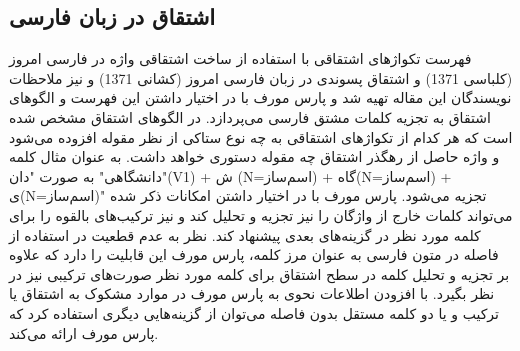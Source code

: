 \documentclass[12pt,onecolumn,a4paper]{article}
\begin{document}
    \subsection{اشتقاق در زبان فارسی}
    فهرست تکواژهای اشتقاقی با استفاده از ساخت اشتقاقی واژه در فارسی امروز (کلباسی 1371) و اشتقاق پسوندی در زبان فارسی امروز (کشانی 1371) و نیز ملاحظات نویسندگان این مقاله تهیه شد و پارس مورف با در اختیار داشتن این فهرست و الگوهای اشتقاق به تجزیه کلمات مشتق فارسی می‌پردازد. در الگوهای اشتقاق مشخص شده است که هر کدام از تکواژهای اشتقاقی به چه نوع ستاکی از نظر مقوله افزوده می‌شود و واژه حاصل از رهگذر اشتقاق چه مقوله دستوری خواهد داشت. به عنوان مثال کلمه "دانشگاهی" به صورت "دان(V1) + ش (N=اسم‌ساز) + گاه(N=اسم‌ساز) + ی(N=اسم‌ساز)" تجزیه می‌شود. پارس مورف با در اختیار داشتن امکانات ذکر شده می‌تواند کلمات خارج از واژگان را نیز تجزیه و تحلیل کند و نیز ترکیب‌های بالقوه را برای کلمه مورد نظر در گزینه‌های بعدی پیشنهاد کند. نظر به عدم قطعیت در استفاده از فاصله در متون فارسی به عنوان مرز کلمه، پارس مورف این قابلیت را دارد که علاوه بر تجزیه و تحلیل کلمه در سطح اشتقاق برای کلمه مورد نظر صورت‌های ترکیبی نیز در نظر بگیرد. با افزودن اطلاعات نحوی به پارس مورف در موارد مشکوک به اشتقاق یا ترکیب و یا دو کلمه مستقل بدون فاصله می‌توان از گزینه‌هایی دیگری استفاده کرد که پارس مورف ارائه می‌کند.
    
    {\mfo
    
    }
\end{document}
